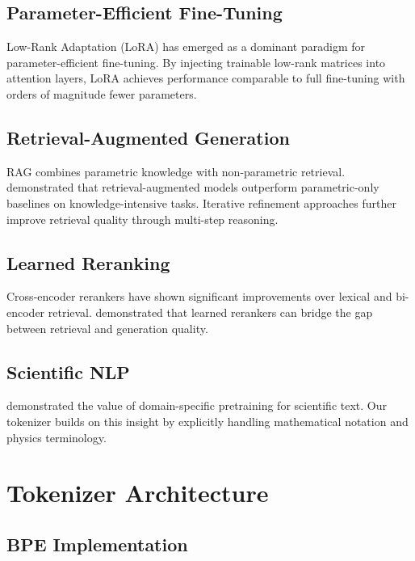 \documentclass[11pt,a4paper]{article}
\theoremstyle{plain}
\theoremstyle{definition}
\begin{document}
\subsection{Parameter-Efficient Fine-Tuning}

Low-Rank Adaptation (LoRA) \citep{hu2021lora} has emerged as a
dominant paradigm for parameter-efficient fine-tuning. By injecting
trainable low-rank matrices into attention layers, LoRA achieves
performance comparable to full fine-tuning with orders of magnitude
fewer parameters.

\subsection{Retrieval-Augmented Generation}

RAG \citep{lewis2020rag} combines parametric knowledge with
non-parametric retrieval. \citet{guu2020realm} demonstrated that
retrieval-augmented models outperform parametric-only baselines on
knowledge-intensive tasks. Iterative refinement approaches
\citep{shi2023replug,trivedi2023interleaving} further improve
retrieval quality through multi-step reasoning.

\subsection{Learned Reranking}

Cross-encoder rerankers \citep{nogueira2019passage} have shown
significant improvements over lexical and bi-encoder retrieval.
\citet{gao2021rethink} demonstrated that learned rerankers can
bridge the gap between retrieval and generation quality.

\subsection{Scientific NLP}

\citet{beltagy2019scibert} demonstrated the value of domain-specific
pretraining for scientific text. Our tokenizer builds on this
insight by explicitly handling mathematical notation and physics
terminology.

\section{Tokenizer Architecture}

\subsection{BPE Implementation}
\end{document}
